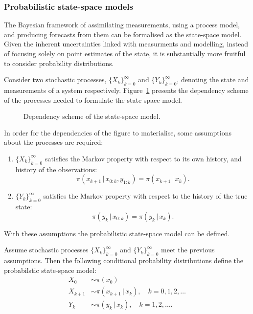 \subsubsection{Probabilistic state-space models}
The Bayesian framework of assimilating measurements, using a process model, and producing forecasts from them can be formalised as the state-space model.
Given the inherent uncertainties linked with measurments and modelling, instead of focusing solely on point estimates of the state, it is substantially more fruitful to consider probability distributions.

Consider two stochastic processes, $\{X_k\}_{k=0}^{\infty}$ and $\{Y_k\}_{k=0}^{\infty}$, denoting the state and measurements of a system respectively.
Figure~\ref{fig:statespacedependency} presents the dependency scheme of the processes needed to formulate the state-space model.
\begin{figure}[h]
    
    \caption{\label{fig:statespacedependency}Dependency scheme of the state-space model.}
\end{figure}
In order for the dependencies of the figure to materialise, some assumptions about the processes are required:
\begin{enumerate}
    \item 
        $\{X_k\}_{k=0}^{\infty}$ satisfies the Markov property with respect to its own history, and history of the observations:
        \begin{equation*}
            \pi (x_{k+1} \, \vert \, x_{0:k}, y_{1:k}) = \pi (x_{k+1} \, \vert \, x_k).
        \end{equation*}
    \item
        $\{Y_k\}_{k=0}^{\infty}$ satisfies the Markov property with respect to the history of the true state:
        \begin{equation*}
            \pi (y_k \, \vert \, x_{0:k}) = \pi (y_k \, \vert \, x_k).
        \end{equation*}
\end{enumerate}
With these assumptions the probabilistic state-space model can be defined.
\begin{definition}\label{def:state-space}
    Assume stochastic processes $\{X_k\}_{k=0}^{\infty}$ and $\{Y_k\}_{k=0}^{\infty}$ meet the previous assumptions.
    Then the following conditional probability distributions define the probabilstic state-space model:
    \begin{subequations}\label{eq:statespace}
        \begin{align}
            X_0 &\sim \pi (x_0)\\
            X_{k+1} &\sim \pi (x_{k+1} \, \vert \, x_{k}), \quad k = 0,1,2,\dots \label{eq:statespace1}\\
            Y_k &\sim \pi (y_k \, \vert \, x_k), \quad k = 1,2,\dots. \label{eq:statespace2}
        \end{align}
    \end{subequations}
\end{definition}
